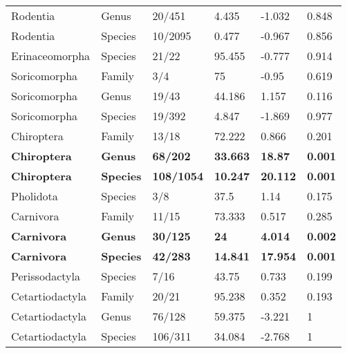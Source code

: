 \begin{longtable}{llllll}
  Rodentia & Genus & 20/451 & 4.435 & -1.032 & 0.848 \\ 
  Rodentia & Species & 10/2095 & 0.477 & -0.967 & 0.856 \\ 
  Erinaceomorpha & Species & 21/22 & 95.455 & -0.777 & 0.914 \\ 
  Soricomorpha & Family & 3/4 & 75 & -0.95 & 0.619 \\ 
  Soricomorpha & Genus & 19/43 & 44.186 & 1.157 & 0.116 \\ 
  Soricomorpha & Species & 19/392 & 4.847 & -1.869 & 0.977 \\ 
  Chiroptera & Family & 13/18 & 72.222 & 0.866 & 0.201 \\ 
  \textbf{Chiroptera} & \textbf{Genus} & \textbf{68/202} & \textbf{33.663} & \textbf{18.87} & \textbf{0.001} \\ 
  \textbf{Chiroptera} & \textbf{Species} & \textbf{108/1054} & \textbf{10.247} & \textbf{20.112} & \textbf{0.001} \\ 
  Pholidota & Species & 3/8 & 37.5 & 1.14 & 0.175 \\ 
  Carnivora & Family & 11/15 & 73.333 & 0.517 & 0.285 \\ 
  \textbf{Carnivora} & \textbf{Genus} & \textbf{30/125} & \textbf{24} & \textbf{4.014} & \textbf{0.002} \\ 
  \textbf{Carnivora} & \textbf{Species} & \textbf{42/283} & \textbf{14.841} & \textbf{17.954} & \textbf{0.001} \\ 
  Perissodactyla & Species & 7/16 & 43.75 & 0.733 & 0.199 \\ 
  Cetartiodactyla & Family & 20/21 & 95.238 & 0.352 & 0.193 \\ 
  Cetartiodactyla & Genus & 76/128 & 59.375 & -3.221 & 1 \\ 
  Cetartiodactyla & Species & 106/311 & 34.084 & -2.768 & 1 \\ 
   \hline
\hline
\end{longtable}
